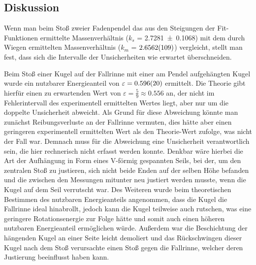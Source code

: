 \documentclass[
	a4paper,
	12pt,
	pagesize,
	ngerman
]{scrartcl}
\begin{document}
	\subsection{Diskussion}
	Wenn man beim Stoß zweier Fadenpendel das aus den Steigungen der Fit-Funktionen ermittelte Massenverhältnis ($k_s$ =  \SI{2,7281 \pm 0,1068}{}) mit dem durch Wiegen ermittelten Massenverhältnis ($k_m$ = $\SI{2,6562 \pm 0,0109}{}$) vergleicht, stellt man fest, dass sich die Intervalle der Unsicherheiten wie erwartet überschneiden.
	\par
	Beim Stoß einer Kugel auf der Fallrinne mit einer am Pendel aufgehängten Kugel wurde ein nutzbarer Energieanteil von $\varepsilon = \SI{0,596 \pm 0,02}{} $ ermittelt.
	Die Theorie gibt hierfür einen zu erwartenden Wert von $\varepsilon = \frac{\num{5}}{\num{9}} \approx \num{0,556}$ an, der nicht im Fehlerintervall des experimentell ermittelten Wertes liegt, aber nur um die doppelte Unsicherheit abweicht.
	Als Grund für diese Abweichung könnte man zunächst Reibungsverluste an der Fallrinne vermuten, dies hätte aber einen geringeren experimentell ermittelten Wert als den Theorie-Wert zufolge, was nicht der Fall war.
	Demnach muss für die Abweichung eine Unsicherheit verantwortlich sein, die hier rechnerisch nicht erfasst werden konnte.
	Denkbar wäre hierbei die Art der Aufhängung in Form eines V-förmig gespannten Seils, bei der, um den zentralen Stoß zu justieren, sich nicht beide Enden auf der selben Höhe befanden und die zwischen den Messungen mitunter neu justiert werden musste, wenn die Kugel auf dem Seil verrutscht war.
	Des Weiteren wurde beim theoretischen Bestimmen des nutzbaren Energieanteils angenommen, dass die Kugel die Fallrinne ideal hinabrollt, jedoch kann die Kugel teilweise auch rutschen, was eine geringere Rotationsenergie zur Folge hätte und somit auch einen höheren nutzbaren Energieanteil ermöglichen würde.
	Außerdem war die Beschichtung der hängenden Kugel an einer Seite leicht demoliert und das Rückschwingen dieser Kugel nach dem Stoß verursachte einen Stoß gegen die Fallrinne, welcher deren Justierung beeinflusst haben kann.
	
\end{document}
